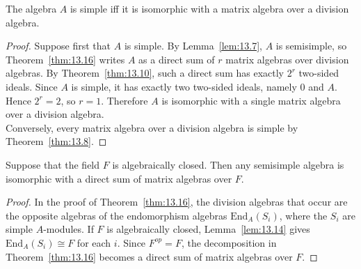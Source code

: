 \documentclass[../Odyssey_Project.tex]{subfiles}
\begin{document}
\begin{theorem}
\label{thm:13.17}
The algebra $A$ is simple iff it is isomorphic with a matrix algebra over a division algebra.
\end{theorem}
\begin{proof}
    Suppose first that $A$ is simple. By Lemma~\ref{lem:13.7}, $A$ is semisimple, so Theorem~\ref{thm:13.16} writes $A$ as a direct sum of $r$ matrix algebras over division algebras. By Theorem~\ref{thm:13.10}, such a direct sum has exactly $2^r$ two-sided ideals. Since $A$ is simple, it has exactly two two-sided ideals, namely $0$ and $A$. Hence $2^r=2$, so $r=1$. Therefore $A$ is isomorphic with a single matrix algebra over a division algebra.\\
    Conversely, every matrix algebra over a division algebra is simple by Theorem~\ref{thm:13.8}.
\end{proof}

\begin{theorem}
\label{thm:13.18}
Suppose that the field $F$ is algebraically closed. Then any semisimple algebra is isomorphic with a direct sum of matrix algebras over $F$.
\end{theorem}
\begin{proof}
    In the proof of Theorem~\ref{thm:13.16}, the division algebras that occur are the opposite algebras of the endomorphism algebras $\mathrm{End}_A(S_i)$, where the $S_i$ are simple $A$-modules. If $F$ is algebraically closed, Lemma~\ref{lem:13.14} gives $\mathrm{End}_A(S_i) \cong F$ for each $i$. Since $F^{op}=F$, the decomposition in Theorem~\ref{thm:13.16} becomes a direct sum of matrix algebras over $F$.
\end{proof}
\end{document}

